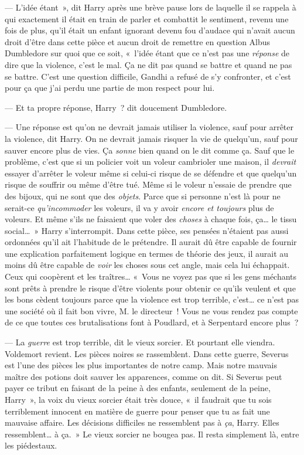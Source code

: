 --- L'idée étant~», dit Harry après une brève pause lors de laquelle il se rappela à qui exactement il était en train de parler et combattit le sentiment, revenu une fois de plus, qu'il était un enfant ignorant devenu fou d'audace qui n'avait aucun droit d'être dans cette pièce et aucun droit de remettre en question Albus Dumbledore sur quoi que ce soit, «~l'idée étant que ce n'est pas une \emph{réponse} de dire que la violence, c'est le mal.
Ça ne dit pas quand se battre et quand ne pas se battre.
C'est une question difficile, Gandhi a refusé de s'y confronter, et c'est pour ça que j'ai perdu une partie de mon respect pour lui.

--- Et ta propre réponse, Harry~? dit doucement Dumbledore.

--- Une réponse est qu'on ne devrait jamais utiliser la violence, sauf pour arrêter la violence, dit Harry.
On ne devrait jamais risquer la vie de quelqu'un, sauf pour sauver encore plus de vies.
Ça \emph{sonne} bien quand on le dit comme ça.
Sauf que le problème, c'est que si un policier voit un voleur cambrioler une maison, il \emph{devrait} essayer d'arrêter le voleur même si celui-ci risque de se défendre et que quelqu'un risque de souffrir ou même d'être tué.
Même si le voleur n'essaie de prendre que des bijoux, qui ne sont que des \emph{objets}.
Parce que si personne n'est là pour ne serait-ce \emph{qu'incommoder} les voleurs, il va y avoir \emph{encore et toujours} plus de voleurs.
Et même s'ils ne faisaient que voler des \emph{choses} à chaque fois, ça… le tissu social…~»
Harry s'interrompit.
Dans cette pièce, ses pensées n'étaient pas aussi ordonnées qu'il ait l'habitude de le prétendre.
Il aurait dû être capable de fournir une explication parfaitement logique en termes de théorie des jeux, il aurait au moins dû être capable de \emph{voir} les choses sous cet angle, mais cela lui échappait.
Ceux qui coopèrent et les traîtres…
«~Vous ne voyez pas que si les gens méchants sont prêts à prendre le risque d'être violents pour obtenir ce qu'ils veulent et que les bons cèdent toujours parce que la violence est trop terrible, c'est… ce n'est pas une société où il fait bon vivre, M. le directeur~!
Vous ne vous rendez pas compte de ce que toutes ces brutalisations font à Poudlard, et à Serpentard encore plus~?

--- La \emph{guerre} est trop terrible, dit le vieux sorcier.
Et pourtant elle viendra.
Voldemort revient.
Les pièces noires se rassemblent.
Dans cette guerre, Severus est l'une des pièces les plus importantes de notre camp.
Mais notre mauvais maître des potions doit sauver les apparences, comme on dit.
Si Severus peut payer ce tribut en faisant de la peine à des enfants, seulement de la peine, Harry~», la voix du vieux sorcier était très douce, «~il faudrait que tu sois terriblement innocent en matière de guerre pour penser que tu as fait une mauvaise affaire.
Les décisions difficiles ne ressemblent pas à \emph{ça}, Harry.
Elles ressemblent… à ça.~»
Le vieux sorcier ne bougea pas.
Il resta simplement là, entre les piédestaux.


